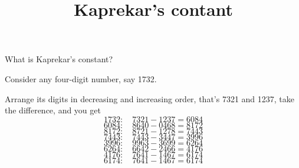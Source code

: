 \documentclass[10pt, letterpaper]{amsart}
\title{Kaprekar's contant}
\begin{document}
What is Kaprekar's constant?

Consider any four-digit number, say 1732.

Arrange its digits in decreasing and increasing order, that's 7321 and 1237, take the difference, and you get
  \[1732: \quad 7321 - 1237 = 6084\]
  \[6084: \quad 8640 - 0468 = 8172\]
  \[8172: \quad 8721 - 1278 = 7443\]
  \[7443: \quad 7443 - 3447 = 3996\]
  \[3996: \quad 9963 - 3699 = 6264\]
  \[6264: \quad 6642 - 2466 = 4176\]
  \[4176: \quad 7641 - 1467 = 6174\]
  \[6174: \quad 7641 - 1467 = 6174\]
\end{document}
